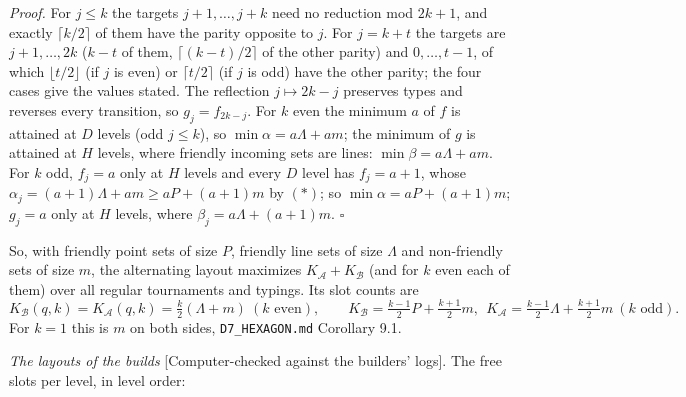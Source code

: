 \documentclass[
  10pt,
]{article}
\begin{document}
\emph{Proof.} For \(j\le k\) the targets \(j+1,\dots,j+k\) need no
reduction mod \(2k+1\), and exactly \(\lceil k/2\rceil\) of them have
the parity opposite to \(j\). For \(j=k+t\) the targets are
\(j+1,\dots,2k\) (\(k-t\) of them, \(\lceil (k-t)/2\rceil\) of the other
parity) and \(0,\dots,t-1\), of which \(\lfloor t/2\rfloor\) (if \(j\)
is even) or \(\lceil t/2\rceil\) (if \(j\) is odd) have the other
parity; the four cases give the values stated. The reflection
\(j\mapsto 2k-j\) preserves types and reverses every transition, so
\(g_j=f_{2k-j}\). For \(k\) even the minimum \(a\) of \(f\) is attained
at \(D\) levels (odd \(j\le k\)), so \(\min\alpha=a\Lambda+am\); the
minimum of \(g\) is attained at \(H\) levels, where friendly incoming
sets are lines: \(\min\beta=a\Lambda+am\). For \(k\) odd, \(f_j=a\) only
at \(H\) levels and every \(D\) level has \(f_j=a+1\), whose
\(\alpha_j=(a+1)\Lambda+am\ge aP+(a+1)m\) by \((\ast)\); so
\(\min\alpha=aP+(a+1)m\); \(g_j=a\) only at \(H\) levels, where
\(\beta_j=a\Lambda+(a+1)m\). \(\square\)

So, with friendly point sets of size \(P\), friendly line sets of size
\(\Lambda\) and non-friendly sets of size \(m\), the alternating layout
maximizes \(K_{\mathcal A}+K_{\mathcal B}\) (and for \(k\) even each of
them) over all regular tournaments and typings. Its slot counts are
\[K_{\mathcal B}(q,k)=K_{\mathcal A}(q,k)=\tfrac k2(\Lambda+m)\ (k\text{ even}),\qquad
K_{\mathcal B}=\tfrac{k-1}2P+\tfrac{k+1}2m,\ \ K_{\mathcal A}=\tfrac{k-1}2\Lambda+\tfrac{k+1}2m\ (k\text{ odd}).\]
For \(k=1\) this is \(m\) on both sides, \texttt{D7\_HEXAGON.md}
Corollary 9.1.

\emph{The layouts of the builds} {[}Computer-checked against the
builders' logs{]}. The free slots per level, in level order:
\end{document}
